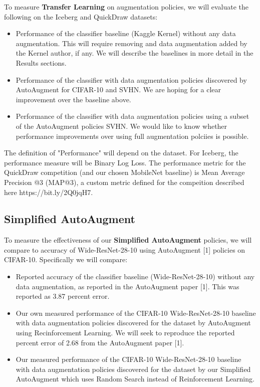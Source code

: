 \documentclass[10pt,twocolumn,letterpaper]{article}
\begin{document}
To measure \textbf{Transfer Learning} on augmentation policies, we will evaluate the following on the Iceberg and QuickDraw datasets:

\begin{itemize}
  \item Performance of the classifier baseline (Kaggle Kernel) without any data augmentation.  This will require removing and data augmentation added by the Kernel author, if any.  We will describe the baselines in more detail in the Results sections.
  \item Performance of the classifier with data augmentation policies discovered by AutoAugment for CIFAR-10 and SVHN.  We are hoping for a clear improvement over the baseline above.
  \item Performance of the classifier with data augmentation policies using a subset of the AutoAugment policies SVHN.  We would like to know whether performance improvements over using full augmentation polciies is possible. 
\end{itemize}

The definition of "Performance" will depend on the dataset.  For Iceberg, the performance measure will be Binary Log Loss.  The performance metric for the QuickDraw competition (and our chosen MobileNet baseline) is Mean Average Precision @3 (MAP@3), a custom metric defined for the compeition described here https://bit.ly/2Q0jqH7. 

\subsection{Simplified AutoAugment}

To measure the effectiveness of our \textbf{Simplified AutoAugment} policies, we will compare to accuracy of Wide-ResNet-28-10 using AutoAugment [1] policies on CIFAR-10.  Specifically we will compare:

\begin{itemize}
  \item Reported accuracy of the classifier baseline (Wide-ResNet-28-10) without any data augmentation, as reported in the AutoAugment paper [1].  This was reported as 3.87 percent error.
  \item Our own measured performance of the CIFAR-10 Wide-ResNet-28-10 baseline with data augmentation policies discovered for the dataset by AutoAugment using Recinforcement Learning.  We will seek to reproduce the reported percent error of 2.68 from the AutoAugment paper [1].
  \item Our measured performance of the  CIFAR-10 Wide-ResNet-28-10 baseline with data augmentation policies discovered for the dataset by our Simplified AutoAugment which uses Random Search instead of Reinforcement Learning.  
\end{itemize}
\end{document}
